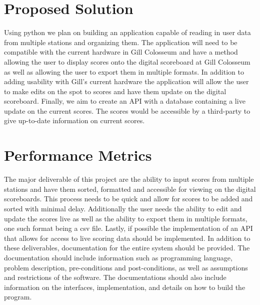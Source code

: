 \documentclass[a4paper, 10pt, draftclsnofoot, onecolumn]{article}
\begin{document}
\section*{Proposed Solution}
Using python we plan on building an application capable of reading in user data from multiple stations and organizing them. The application will need to be compatible with the current hardware in Gill Colosseum and have a method allowing the user to display scores onto the digital scoreboard at Gill Colosseum as well as allowing the user to export them in multiple formats. In addition to adding usability with Gill's current hardware the application will allow the user to make edits on the spot to scores and have them update on the digital scoreboard. Finally, we aim to create an API with a database containing a live update on the current scores. The scores would be accessible by a third-party to give up-to-date information on current scores.

\section*{Performance Metrics}
The major deliverable of this project are the ability to input scores from multiple stations and have them sorted, formatted and accessible for viewing on the digital scoreboards. This process needs to be quick and allow for scores to be added and sorted with minimal delay. Additionally the user needs the ability to edit and update the scores live as well as the ability to export them in multiple formats, one such format being a csv file. Lastly, if possible the implementation of an API that allows for access to live scoring data should be implemented. In addition to these deliverables, documentation for the entire system should be provided. The documentation should include information such as programming language, problem description, pre-conditions and post-conditions, as well as assumptions and restrictions of the software. The documentations should also include information on the interfaces, implementation, and details on how to build the program.


\end{document}
